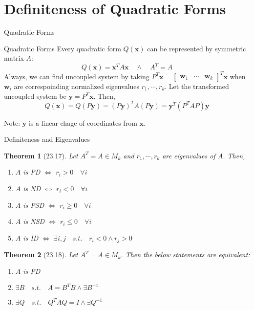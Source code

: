 \documentclass[final]{beamer}
\newtheorem{thm}{Theorem}
\newcommand{\bd}{\mathbf}
\begin{document}
\section{Definiteness of Quadratic Forms} %
\label{sec:definiteness_of_quadratic_forms}
\begin{frame}[t]{Quadratic Forms}
	\begin{block}
		{Quadratic Forms} Every quadratic form $Q(\bd{x})$ can be represented by symmetric matrix $A$:\[
			Q(\bd{x}) = \bd{x}^T A \bd{x}\quad\land\quad A^T = A
		\]Always, we can find uncoupled system by taking $P^T \bd{x}=\begin{bmatrix}
			\bd{w}_1&\cdots&\bd{w}_k
		\end{bmatrix}^T\bd{x}$ when $\bd{w}_i$ are correspoinding normalized eigenvalues $r_1,\cdots,r_k$.
		Let the transformed uncoupled system be $\bd{y}=P^T\bd{x}$. Then, \[
			Q(\bd{x}) = Q(P\bd{y}) = (P\bd{y})^TA(P\bd{y})= \bd{y}^T (P^TAP)\bd{y}
		\]
	\end{block}
	Note: $\bd{y}$ is a linear chage of coordinates from $\bd{x}$.
\end{frame}

\begin{frame}[t]{Definiteness and Eigenvalues}
	\begin{thm}
		[23.17] Let $A^T=A\in M_k$ and $r_1,\cdots,r_k$ are eigenvalues of $A$. Then,
		\begin{enumerate}
			\item $A$ is PD $\iff$ $r_i>0\quad \forall i$
			\item $A$ is ND $\iff$ $r_i<0\quad \forall i$
			\item $A$ is PSD $\iff$ $r_i\ge 0\quad \forall i$
			\item $A$ is NSD $\iff$ $r_i\le 0\quad \forall i$
			\item $A$ is ID $\iff$ $\exists i,j \quad s.t. \quad  r_i<0 \land  r_j>0 $
		\end{enumerate}
	\end{thm}
	\begin{thm}
		[23.18]
		Let $A^T=A\in M_k$. Then the below statements are equivalent:
		\begin{enumerate}
			\item $A$ is PD
			\item $\exists B\quad s.t. \quad A=B^TB\land \exists B^{-1}$
			\item $\exists Q\quad s.t. \quad Q^TAQ=I\land\exists Q^{-1}$
		\end{enumerate}
	\end{thm}
\end{frame}
\end{document}
